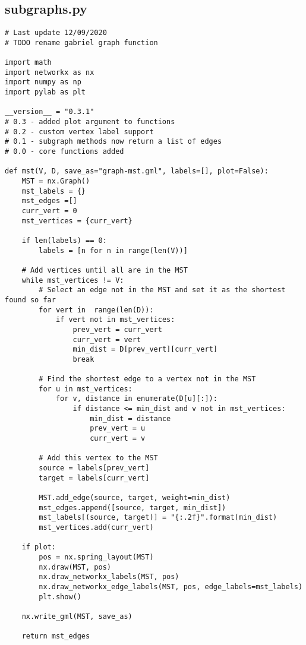 \documentclass[11pt, a4paper]{article}
\begin{document}
\subsection{subgraphs.py}
\begin{verbatim}
# Last update 12/09/2020
# TODO rename gabriel graph function

import math
import networkx as nx
import numpy as np
import pylab as plt

__version__ = "0.3.1"
# 0.3 - added plot argument to functions
# 0.2 - custom vertex label support
# 0.1 - subgraph methods now return a list of edges
# 0.0 - core functions added

def mst(V, D, save_as="graph-mst.gml", labels=[], plot=False):
    MST = nx.Graph()
    mst_labels = {}
    mst_edges =[]
    curr_vert = 0
    mst_vertices = {curr_vert}
    
    if len(labels) == 0:
        labels = [n for n in range(len(V))]
        
    # Add vertices until all are in the MST
    while mst_vertices != V:
        # Select an edge not in the MST and set it as the shortest found so far
        for vert in  range(len(D)):
            if vert not in mst_vertices:
                prev_vert = curr_vert
                curr_vert = vert
                min_dist = D[prev_vert][curr_vert] 
                break
        
        # Find the shortest edge to a vertex not in the MST
        for u in mst_vertices:
            for v, distance in enumerate(D[u][:]):
                if distance <= min_dist and v not in mst_vertices:
                    min_dist = distance
                    prev_vert = u
                    curr_vert = v
                    
        # Add this vertex to the MST
        source = labels[prev_vert]
        target = labels[curr_vert]
        
        MST.add_edge(source, target, weight=min_dist)
        mst_edges.append([source, target, min_dist])
        mst_labels[(source, target)] = "{:.2f}".format(min_dist)
        mst_vertices.add(curr_vert)
        
    if plot:
        pos = nx.spring_layout(MST)
        nx.draw(MST, pos)
        nx.draw_networkx_labels(MST, pos)
        nx.draw_networkx_edge_labels(MST, pos, edge_labels=mst_labels)
        plt.show()
    
    nx.write_gml(MST, save_as)
    
    return mst_edges



\end{verbatim}
\end{document}
